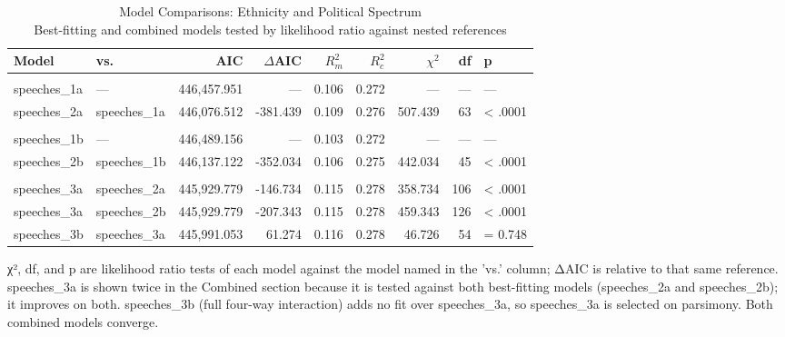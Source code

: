 \begin{table}
\caption*{
{\large Model Comparisons: Ethnicity and Political Spectrum} \\ 
{\small Best-fitting and combined models tested by likelihood ratio against nested references}
} 
\fontsize{12.0pt}{14.4pt}\selectfont
\begin{tabular*}{\linewidth}{@{\extracolsep{\fill}}llrrrrrrl}
\toprule
Model & vs. & AIC & $\Delta$AIC & $R^2_m$ & $R^2_c$ & $\chi^2$ & df & p \\ 
\midrule\addlinespace[2.5pt]
\multicolumn{9}{l}{{Ethnicity Models}} \\[2.5pt] 
\midrule\addlinespace[2.5pt]
speeches\_1a & — & 446,457.951 & — & 0.106 & 0.272 & — & — & — \\ 
speeches\_2a & speeches\_1a & 446,076.512 & -381.439 & 0.109 & 0.276 & 507.439 & 63 & < .0001 \\ 
\midrule\addlinespace[2.5pt]
\multicolumn{9}{l}{{Spectrum Models}} \\[2.5pt] 
\midrule\addlinespace[2.5pt]
speeches\_1b & — & 446,489.156 & — & 0.103 & 0.272 & — & — & — \\ 
speeches\_2b & speeches\_1b & 446,137.122 & -352.034 & 0.106 & 0.275 & 442.034 & 45 & < .0001 \\ 
\midrule\addlinespace[2.5pt]
\multicolumn{9}{l}{{Combined Model}} \\[2.5pt] 
\midrule\addlinespace[2.5pt]
speeches\_3a & speeches\_2a & 445,929.779 & -146.734 & 0.115 & 0.278 & 358.734 & 106 & < .0001 \\ 
speeches\_3a & speeches\_2b & 445,929.779 & -207.343 & 0.115 & 0.278 & 459.343 & 126 & < .0001 \\ 
speeches\_3b & speeches\_3a & 445,991.053 & 61.274 & 0.116 & 0.278 & 46.726 & 54 & = 0.748 \\ 
\bottomrule
\end{tabular*}
\begin{minipage}{\linewidth}
χ², df, and p are likelihood ratio tests of each model against the model named in the 'vs.' column; ΔAIC is relative to that same reference. speeches\_3a is shown twice in the Combined section because it is tested against both best-fitting models (speeches\_2a and speeches\_2b); it improves on both. speeches\_3b (full four-way interaction) adds no fit over speeches\_3a, so speeches\_3a is selected on parsimony. Both combined models converge.\\
\end{minipage}
\end{table}


